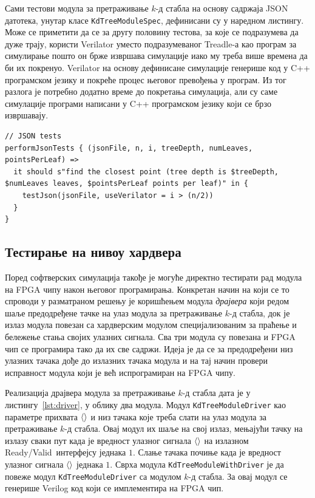 \documentclass[master]{finthesis}
\newcommand*{\kd}{\texorpdfstring{$k$}{k}-д }
\newcommand*{\correctmath}[1]{%
    \ifcsname mathCorrectionFor#1\endcsname%
        \csname mathCorrectionFor#1\endcsname%
    \else%
        #1%
    \fi%
}
\newcommand*{\mfield}[1]{{\langle\correctmath{#1}\/\rangle}}
\newcommand*{\field}[1]{\texorpdfstring{$\mfield{#1}$}{⟨#1⟩}}
\newcommand{\rv}{Ready\slash Valid}
\newcommand*{\prog}[1]{\texttt{#1}}
\begin{document}
Сами тестови модула за претраживање \kd стабла на основу садржаја JSON датотека, унутар класе \prog{KdTreeModuleSpec}, дефинисани су у наредном листингу. Може се приметити да се за другу половину тестова, за које се подразумева да дуже трају, користи Verilator уместо подразумеваног Treadle-а као програм за симулирање пошто он брже извршава симулације иако му треба више времена да би их покренуо. Verilator на основу дефинисане симулације генерише код у C++ програмском језику и покреће процес његовог превођења у програм. Из тог разлога је потребно додатно време до покретања симулација, али су саме симулације програми написани у C++ програмском језику који се брзо извршавају.

\clearpage
\begin{lstlisting}[style=Chisel, caption={Спецификација тестова модула за претраживање \kd стабла на основу постојећих JSON датотека.}, label={lst:test:json}]
// JSON tests
performJsonTests { (jsonFile, n, i, treeDepth, numLeaves, pointsPerLeaf) =>
  it should s"find the closest point (tree depth is $treeDepth, $numLeaves leaves, $pointsPerLeaf points per leaf)" in {
    testJson(jsonFile, useVerilator = i > (n/2))
  }
}
\end{lstlisting}

\subsection{Тестирање на нивоу хардвера}

Поред софтверских симулација такође је могуће директно тестирати рад модула на FPGA чипу након његовог програмирања. Конкретан начин на који се то спроводи у разматраном решењу је коришћењем модула \emph{драјвера} који редом шаље предодређене тачке на улаз модула за претраживање \kd стабла, док је излаз модула повезан са хардверским модулом специјализованим за праћење и бележење стања својих улазних сигнала. Сва три модула су повезана и FPGA чип се програмира тако да их све садржи. Идеја је да се за предодређени низ улазних тачака дође до излазних тачака модула и на тај начин провери исправност модула који је већ испрограмиран на FPGA чипу.

Реализација драјвера модула за претраживање \kd стабла дата је у листингу~\ref{lst:driver}, у облику два модула. Модул \prog{KdTreeModuleDriver} као параметре прихвата \field{pointElemWidth} и низ тачака које треба слати на улаз модула за претраживање \kd стабла. Овај модул их шаље на свој излаз, мењајући тачку на излазу сваки пут када је вредност улазног сигнала \field{ready} на излазном \rv\ интерфејсу једнака $1$. Слање тачака почиње када је вредност улазног сигнала \field{start} једнака $1$. Сврха модула \prog{KdTreeModuleWithDriver} је да повеже модул \prog{KdTreeModuleDriver} са модулом \kd стабла. За овај модул се генерише Verilog код који се имплементира на FPGA чип.
\end{document}
